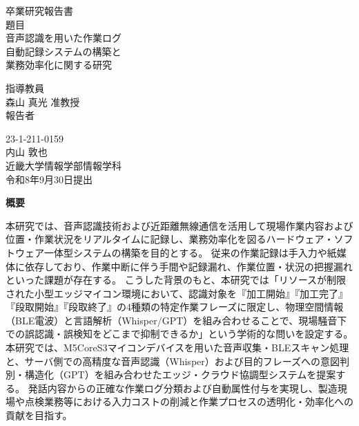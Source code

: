 \documentclass[a4paper,12pt,ja=standard,lualatex]{bxjsarticle}
\begin{document}
\pagestyle{empty}

\begin{center}
\vspace*{1cm}
\large
{\LARGE 卒業研究報告書}\\
\vspace*{0.8cm}
題目\\
\vspace*{1cm}
{\Huge{音声認識を用いた作業ログ}}\\
{\Huge{自動記録システムの構築と}}\\
{\Huge{業務効率化に関する研究}}\\
\vspace{3mm}

\vspace*{3cm}
指導教員\\
\vspace*{0.3cm}
{\LARGE 森山 真光 准教授}\\ 
\vspace*{3cm}
報告者\\
\vspace*{0.3cm}

{23-1-211-0159}\\
\vspace*{0.3cm}
{\Huge 内山 敦也}\\
\vspace*{0.5cm}
近畿大学情報学部情報学科\\
\vspace*{2cm}
令和8年9月30日提出\\
\end{center}

\newpage
\normalsize

\clearpage
\begin{center}
{\bf \Large 概要}
\end{center} 
本研究では、音声認識技術および近距離無線通信を活用して現場作業内容および位置・作業状況をリアルタイムに記録し、業務効率化を図るハードウェア・ソフトウェア一体型システムの構築を目的とする。
従来の作業記録は手入力や紙媒体に依存しており、作業中断に伴う手間や記録漏れ、作業位置・状況の把握漏れといった課題が存在する。
こうした背景のもと、本研究では「リソースが制限された小型エッジマイコン環境において、認識対象を『加工開始』『加工完了』『段取開始』『段取終了』の4種類の特定作業フレーズに限定し、物理空間情報（BLE電波）と言語解析（Whisper/GPT）を組み合わせることで、現場騒音下での誤認識・誤検知をどこまで抑制できるか」という学術的な問いを設定する。
本研究では、M5CoreS3マイコンデバイスを用いた音声収集・BLEスキャン処理と、サーバ側での高精度な音声認識（Whisper）および目的フレーズへの意図判別・構造化（GPT）を組み合わせたエッジ・クラウド協調型システムを提案する。
発話内容からの正確な作業ログ分類および自動属性付与を実現し、製造現場や点検業務等における入力コストの削減と作業プロセスの透明化・効率化への貢献を目指す。
\end{document}
